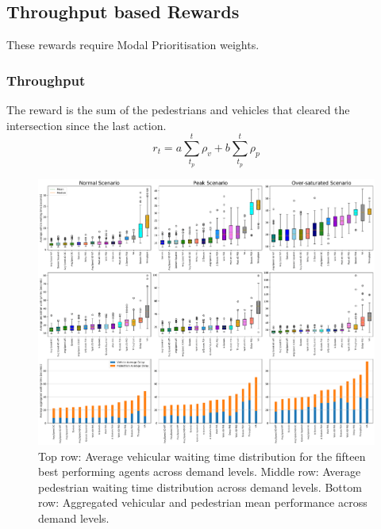 \documentclass[conference]{IEEEtran}
\begin{document}
\subsection{Throughput based Rewards}
These rewards require Modal Prioritisation weights.
\subsubsection{Throughput}
The reward is the sum of the pedestrians and vehicles that cleared the intersection since the last action.
\begin{equation}
    r_t = a \sum_{t_p}^t \rho_v + b \sum_{t_p}^t \rho_p
\label{eq:throughput}
\end{equation}
\begin{figure}                                                
\centering                                                    
\includegraphics[width=\textwidth]{9grid_ordered_boxplot_all.png}                                    
\caption{Top row: Average vehicular waiting time distribution for the fifteen best performing agents across demand levels. Middle row: Average pedestrian waiting time distribution across demand levels. Bottom row: Aggregated vehicular and pedestrian mean performance across demand levels.}                                  
\label{fig:results_9_grid}    
                                          
\end{figure}
\end{document}
